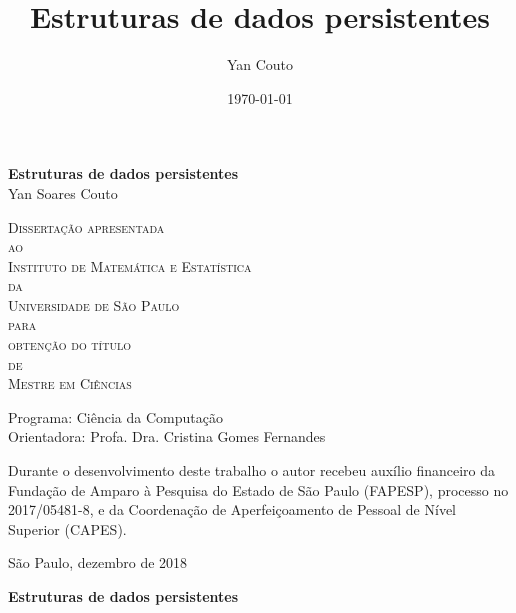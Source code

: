 \documentclass[11pt,oneside,a4paper, openany]{book}
\title{Estruturas de dados persistentes}
\author{Yan Couto}
\date{\today}
\begin{document}
\frontmatter

\thispagestyle{empty}
\begin{center}
    \vspace*{2.3cm}
    \textbf{\Large{Estruturas de dados persistentes}}\\

    \vspace*{1.2cm}
    \Large{Yan Soares Couto}

    \vskip 2cm
    \textsc{
    Dissertação apresentada\\[-0.25cm] 
    ao\\[-0.25cm]
    Instituto de Matemática e Estatística\\[-0.25cm]
    da\\[-0.25cm]
    Universidade de São Paulo\\[-0.25cm]
    para\\[-0.25cm]
    obtenção do título\\[-0.25cm]
    de\\[-0.25cm]
    Mestre em Ciências}

    \vskip 1.5cm
    Programa: Ciência da Computação\\
    Orientadora: Profa. Dra. Cristina Gomes Fernandes

    \vskip 1cm
    \normalsize{Durante o desenvolvimento deste trabalho o autor recebeu auxílio financeiro da Fundação de Amparo à Pesquisa do Estado de São Paulo (FAPESP), processo no 2017/05481-8, e da Coordenação de Aperfeiçoamento de Pessoal de Nível Superior (CAPES).}

    \vskip 0.5cm
    \normalsize{São Paulo, dezembro de 2018}
\end{center}

%
%
%
\newpage
\thispagestyle{empty}
    \begin{center}
        \vspace*{2.3 cm}
        \textbf{\Large{Estruturas de dados persistentes}}\\
        \vspace*{2 cm}
    \end{center}
\end{document}
